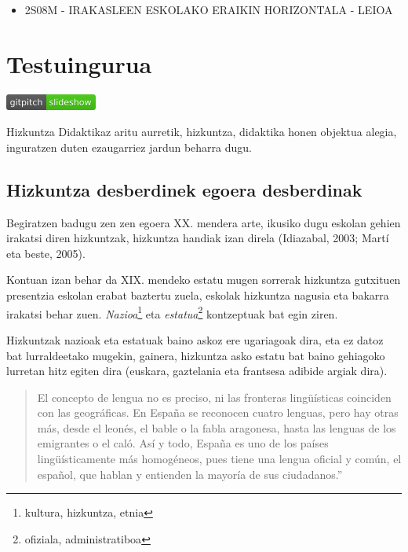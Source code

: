 \documentclass[
]{book}
\providecommand{\tightlist}{%
  \setlength{\itemsep}{0pt}\setlength{\parskip}{0pt}}
\begin{document}
\begin{itemize}
\tightlist
\item
  2S08M - IRAKASLEEN ESKOLAKO ERAIKIN HORIZONTALA - LEIOA
\end{itemize}

\hypertarget{testuingurua}{%
\chapter{Testuingurua}\label{testuingurua}}

\href{../Diapoak/01_Diap-testuingurua.html}{\includegraphics{assets/badge.png}}

Hizkuntza Didaktikaz aritu aurretik, hizkuntza, didaktika honen objektua alegia, inguratzen duten ezaugarriez jardun beharra dugu.

\hypertarget{hizkuntza-desberdinek-egoera-desberdinak}{%
\section{Hizkuntza desberdinek egoera desberdinak}\label{hizkuntza-desberdinek-egoera-desberdinak}}

Begiratzen badugu zen zen egoera XX. mendera arte, ikusiko dugu eskolan gehien irakatsi diren hizkuntzak, hizkuntza handiak izan direla (Idiazabal, 2003; Martí eta beste, 2005).

Kontuan izan behar da XIX. mendeko estatu mugen sorrerak hizkuntza gutxituen presentzia eskolan erabat baztertu zuela, eskolak hizkuntza nagusia eta bakarra irakatsi behar zuen. \emph{Nazioa}\footnote{kultura, hizkuntza, etnia} eta \emph{estatua}\footnote{ofiziala, administratiboa} kontzeptuak bat egin ziren.

Hizkuntzak nazioak eta estatuak baino askoz ere ugariagoak dira, eta ez datoz bat lurraldeetako mugekin, gainera, hizkuntza asko estatu bat baino gehiagoko lurretan hitz egiten dira (euskara, gaztelania eta frantsesa adibide argiak dira).

\begin{quote}
El concepto de lengua no es preciso, ni las fronteras lingüísticas coinciden con las geográficas. En España se reconocen cuatro lenguas, pero hay otras más, desde el leonés, el bable o la fabla aragonesa, hasta las lenguas de los emigrantes o el caló. Así y todo, España es uno de los países lingüísticamente más homogéneos, pues tiene una lengua oficial y común, el español, que hablan y entienden la mayoría de sus ciudadanos.''
\end{quote}
\end{document}
